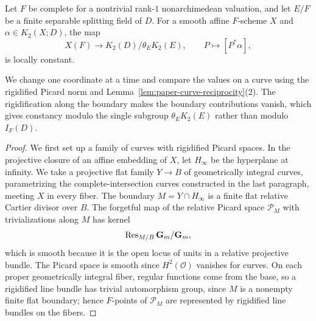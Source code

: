 \begin{proposition}\label{prop:paper-picard-eval}
Let $F$ be complete for a nontrivial rank-$1$ nonarchimedean valuation, and let $E/F$ be a finite separable splitting field of $D$.
For a smooth affine $F$-scheme $X$ and $\alpha\in K_2(X;D)$, the map
\[
 X(F)\longrightarrow K_2(D)/\theta_E K_2(E),\qquad P\longmapsto[P^*\alpha],
\]
is locally constant.
\end{proposition}

We change one coordinate at a time and compare the values on a curve using the rigidified Picard norm and Lemma~\ref{lem:paper-curve-reciprocity}(2).
The rigidification along the boundary makes the boundary contributions vanish, which gives constancy modulo the single subgroup $\theta_EK_2(E)$ rather than modulo $I_F(D)$.

\begin{proof}
We first set up a family of curves with rigidified Picard spaces.
In the projective closure of an affine embedding of $X$, let $H_\infty$ be the hyperplane at infinity.
We take a projective flat family $Y\to B$ of geometrically integral curves, parametrizing the complete-intersection curves constructed in the last paragraph, meeting $X$ in every fiber.
The boundary $M=Y\cap H_\infty$ is a finite flat relative Cartier divisor over $B$.
The forgetful map of the relative Picard space $\mathcal P_M$ with trivializations along $M$ has kernel
\[
 \operatorname{Res}_{M/B}\mathbf G_m/\mathbf G_m,
\]
which is smooth because it is the open locus of units in a relative projective bundle.
The Picard space is smooth since $H^2(\mathcal O)$ vanishes for curves.
On each proper geometrically integral fiber, regular functions come from the base, so a rigidified line bundle has trivial automorphism group, since $M$ is a nonempty finite flat boundary; hence $F$-points of $\mathcal P_M$ are represented by rigidified line bundles on the fibers.


\end{proof}
